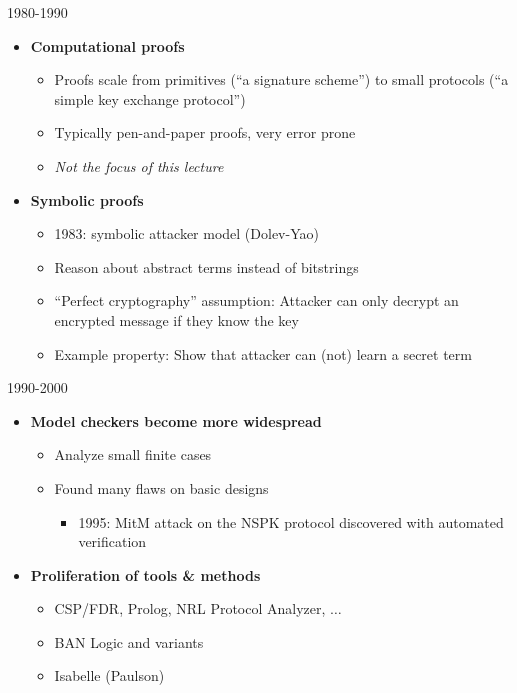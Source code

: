 \documentclass[11pt,aspectratio=169]{beamer}
\begin{document}
\begin{frame}[fragile]{1980-1990}
    \begin{itemize}
        \item \textbf{Computational proofs}
        \begin{itemize}
            \item Proofs scale from primitives (``a signature scheme'') to 
                  small protocols (``a simple key exchange protocol'')
            \item Typically pen-and-paper proofs, very error prone
            \item \textit{Not the focus of this lecture}
        \end{itemize}
        \item \textbf{Symbolic proofs}
        \begin{itemize}
            \item 1983: symbolic attacker model (Dolev-Yao)
            \item Reason about abstract terms instead of bitstrings
            \item ``Perfect cryptography'' assumption: Attacker can only 
                  decrypt an encrypted message if they know the key
            \item Example property: Show that attacker can (not) learn a secret 
                  term
        \end{itemize}
    \end{itemize}
\end{frame}

\begin{frame}[fragile]{1990-2000}
    \begin{itemize}
        \item \textbf{Model checkers become more widespread}
        \begin{itemize}
            \item Analyze small finite cases
            \item Found many flaws on basic designs
                \begin{itemize}
                    \item 1995: MitM attack on the NSPK protocol discovered 
                          with automated verification
                \end{itemize}
        \end{itemize}
        \item \textbf{Proliferation of tools \& methods}
        \begin{itemize}
            \item CSP/FDR, Prolog, NRL Protocol Analyzer, $\dots$
            \item BAN Logic and variants
            \item Isabelle (Paulson)
        \end{itemize}
    \end{itemize}
\end{frame}
\end{document}
